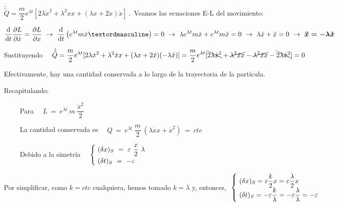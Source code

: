 	$\displaystyle \dot{\tilde{\tilde Q}}= 
	\dfrac m 2 e^{\lambda t} [ 2\lambda \dot x^2 + \lambda^2 \dot x x +(\lambda x + 2\dot x) \ddot x ] \, . \ $
 Veamos las ecuaciones E-L del movimiento:
 
 $\displaystyle \dv{t}\pdv{L}{\dot x}=\pdv{L}{x} \ \to \ \dv{t} \left( e^{\lambda t} m \dot x º\right) = 0 \ \to \ \lambda e^{\lambda t} m \dot x + e^{\lambda t} m \ddot x = 0 \ \to \ \lambda \dot x + \ddot x =0 \ \to \ \boldsymbol{\ddot x=-\lambda \dot x} $ 
 
 Sustituyendo $\quad \displaystyle \dot{\tilde{\tilde Q}}= 
 \dfrac m 2 e^{\lambda t} [ 2\lambda \dot x^2 + \lambda^2 \dot x x + (\lambda x+2\dot x) (-\lambda \dot x) ] = 
 \dfrac m 2 e^{\lambda t} [\bcancel{ 2\lambda \dot x^2 }+ \cancel{\lambda^2 \dot x x } - \cancel{\lambda^2 \dot x x} - \bcancel{2\lambda \dot x^2} ]=0  $
 
Efectivamente, hay una cantidad conservada a lo largo de la trayectoria de la partícula.

\vspace{10mm}

\begin{adjustwidth}{25pt}{25pt}
\begin{destacado}
Recapitulando:

$\qquad$ Para $\quad L \ = \ e^{\lambda t} \ m \ \dfrac{\dot x^2}{2}$

$\qquad$ La cantidad conservada es $\quad Q \ = \ e^{\lambda t} \ \dfrac m 2 \ (\lambda \dot x x + \dot x^2 ) \ = \ cte$

$\qquad$ Debido a la simetría $\quad \begin{cases} \ (\var x)_S \ = \ \varepsilon \ \dfrac x 2 \ \lambda \\ \ (\var t)_S \ = \ - \varepsilon  \end{cases}$	
\end{destacado}	
\end{adjustwidth}

\begin{small}
Por simplificar, como $k=cte$ cualquiera, hemos tomado $k=\lambda$ y, entonces,  $\ \begin{cases} \ (\var x)_S=\varepsilon \dfrac k 2 x = \varepsilon \dfrac \lambda 2 x \\ \ (\var t)_S=-\varepsilon \dfrac k \lambda = -\varepsilon \dfrac \lambda\lambda = -\varepsilon  \end{cases}$
\end{small}
	
\vspace{5mm}

